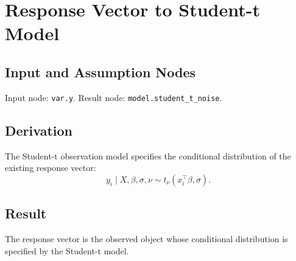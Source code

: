 \section{Response Vector to Student-t Model}
\label{edge:y-to-student-t-model}

\subsection{Input and Assumption Nodes}
Input node: \texttt{var.y}. Result node: \texttt{model.student\_t\_noise}.

\subsection{Derivation}
The Student-t observation model specifies the conditional distribution of the existing response vector:
\[
  y_i \mid X,\beta,\sigma,\nu \sim t_\nu(x_i^\top\beta,\sigma).
\]

\subsection{Result}
The response vector is the observed object whose conditional distribution is specified by the Student-t model.
